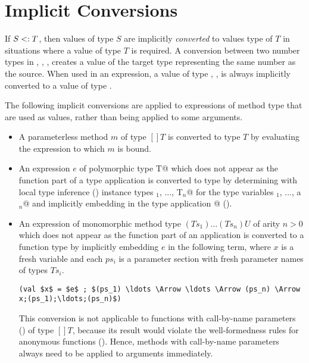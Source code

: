\documentclass[11pt]{report}
\begin{document}
\section{Implicit Conversions}
\label{sec:impl-conv}

If $S <: T$, then values of type $S$ are implicitly {\em
converted} to values type of $T$ in situations where a value of type
$T$ is required. A conversion between two number types in \verb@int@,
\verb@long@, \verb@float@, \verb@double@ creates a value of the target
type representing the same number as the source.  When used in an
expression, a value of type \verb@byte@, \verb@char@, \verb@short@ is
always implicitly converted to a value of type \verb@int@.

The following implicit conversions are applied to expressions of
method type that are used as values, rather than being applied to some
arguments.
\begin{itemize}
\item
A parameterless method $m$ of type $[] T$
is converted to type $T$ by evaluating the expression to which $m$ is bound.
\item
An expression $e$ of polymorphic type 
\verb@[a$_1$ >: L$_1$ <: U$_1$, ..., a$_n$ >: L$_n$ <: U$_n$]T@
which does not appear as the function part of
a type application is converted to type \verb@T@
by determining with local type inference
() instance types \verb@T$_1$, ..., T$_n$@
for the type variables \verb@a$_1$, ..., a$_n$@ and
implicitly embedding \verb@e@ in the type application
\verb@e[U$_1$, ..., U$_n$]@ ().
\item
An expression \verb@e@ of monomorphic method type
$(Ts_1) \ldots (Ts_n) U$ of arity $n > 0$
which does not appear as the function part of an application is
converted to a function type by implicitly embedding $e$ in
the following term, where $x$ is a fresh variable and each $ps_i$ is a
parameter section with fresh parameter names of types $Ts_i$.
\begin{verbatim}
(val $x$ = $e$ ; $(ps_1) \ldots \Arrow \ldots \Arrow (ps_n) \Arrow x;(ps_1);\ldots;(ps_n)$)
\end{verbatim}
This conversion is not applicable to functions with call-by-name
parameters () of type $[]T$, because its result
would violate the well-formedness rules for anonymous functions
(). Hence, methods with call-by-name
parameters always need to be applied to arguments immediately.
\end{itemize}
\end{document}
